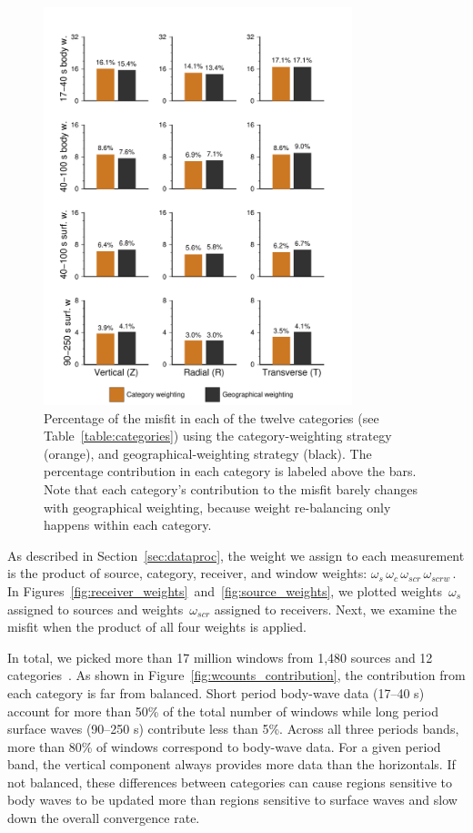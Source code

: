 \begin{figure}
\centering
\includegraphics[width=0.8\textwidth]{ch-weighting/figures/category_misfit_contribution_color.pdf} 
\caption{\small{Percentage of the misfit in each of the twelve categories (see Table~\ref{table:categories}) using the category-weighting strategy (orange),
and geographical-weighting 
strategy (black). The percentage contribution in each category is labeled above the bars. Note that each category's contribution to the misfit barely changes with geographical weighting, because weight re-balancing only happens within each category.
}}
\label{fig:weights_histogram}
\end{figure}

As described in Section~\ref{sec:dataproc}, the weight we assign to each measurement is the product of source, category, receiver, 
and window weights: $\omega_{s}\, \omega_{c} \,\omega_{scr}\, \omega_{scrw}$\,.
In Figures~\ref{fig:receiver_weights}~and~\ref{fig:source_weights},
we plotted weights~$\omega_{s}$ assigned to sources and weights~$\omega_{scr}$ assigned to receivers.  
Next, we examine the misfit when the product of all four weights is applied.  

In total, we picked more than 17 million windows from 1,480 sources and 12 categories~\cite{Lei2018}. 
As shown in Figure~\ref{fig:wcounts_contribution}, 
the contribution from each category is far from balanced.  Short period body-wave data (17--40 s)
account for more than 50\% of the total number of windows while long period surface waves (90--250 s) contribute less than 5\%.
Across all three periods bands, more than 80\% of windows correspond to body-wave data.  For a given period band, the vertical component always provides more 
data than the horizontals.
If not balanced, these differences between categories can cause regions 
sensitive to body waves to be updated more than regions sensitive to surface waves and slow down the overall convergence rate.    

